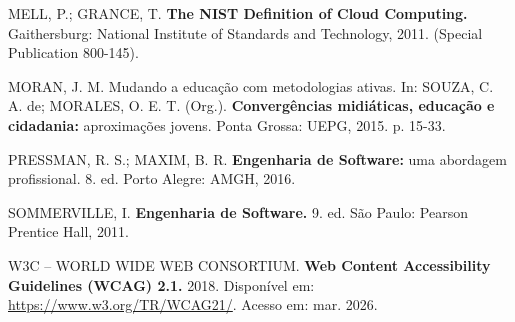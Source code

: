 \begin{singlespace}
\vspace{\baselineskip}

MELL, P.; GRANCE, T. \textbf{The NIST Definition of Cloud Computing.} Gaithersburg: National Institute of Standards and Technology, 2011. (Special Publication 800-145).

\vspace{\baselineskip}

MORAN, J. M. Mudando a educação com metodologias ativas. In: SOUZA, C. A. de; MORALES, O. E. T. (Org.). \textbf{Convergências midiáticas, educação e cidadania:} aproximações jovens. Ponta Grossa: UEPG, 2015. p. 15-33.

\vspace{\baselineskip}

PRESSMAN, R. S.; MAXIM, B. R. \textbf{Engenharia de Software:} uma abordagem profissional. 8. ed. Porto Alegre: AMGH, 2016.

\vspace{\baselineskip}

SOMMERVILLE, I. \textbf{Engenharia de Software.} 9. ed. São Paulo: Pearson Prentice Hall, 2011.

\vspace{\baselineskip}

W3C -- WORLD WIDE WEB CONSORTIUM. \textbf{Web Content Accessibility Guidelines (WCAG) 2.1.} 2018. Disponível em: \url{https://www.w3.org/TR/WCAG21/}. Acesso em: mar. 2026.

\end{singlespace}

